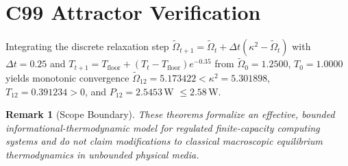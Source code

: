 \documentclass[11pt,a4paper]{article}
\newtheorem{remark}{Remark}[section]
\begin{document}
\section{C99 Attractor Verification}
Integrating the discrete relaxation step $\tilde{\Omega}_{t+1} = \tilde{\Omega}_t + \Delta t(\kappa^2 - \tilde{\Omega}_t)$ with $\Delta t = 0.25$ and $T_{t+1} = T_{\mathrm{floor}} + (T_t - T_{\mathrm{floor}})e^{-0.35}$ from $\tilde{\Omega}_0 = 1.2500$, $T_0 = 1.0000$ yields monotonic convergence $\tilde{\Omega}_{12} = 5.173422 < \kappa^2 = 5.301898$, $T_{12} = 0.391234 > 0$, and $P_{12} = 2.5453$\,W $\le 2.58$\,W.

\begin{remark}[Scope Boundary]
These theorems formalize an effective, bounded informational-thermodynamic model for regulated finite-capacity computing systems and do not claim modifications to classical macroscopic equilibrium thermodynamics in unbounded physical media.
\end{remark}
\end{document}

